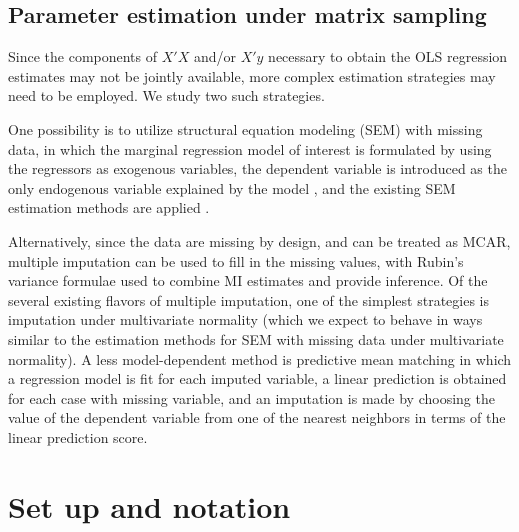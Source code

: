 \documentclass[11pt]{asaproc}
\begin{document}
\subsection{Parameter estimation under matrix sampling}

Since the components of $X'X$ and/or $X'y$ necessary to obtain the OLS regression
estimates may not be jointly available, more complex estimation strategies may need to
be employed. We study two such strategies.

One possibility is to utilize structural equation modeling (SEM) with missing data,
in which the marginal regression model of interest is formulated by using the regressors
as exogenous variables, the dependent variable is introduced as the only endogenous variable
explained by the model
\citep{bollen:selv:1989},
and the existing SEM estimation methods are applied
\citep{yuan:bentler:2000,savalei:2010}.

Alternatively, since the data are missing by design, and can be treated as MCAR, multiple imputation
\citep[MI]{rubin:1996,vanbuuren:2012}
can be used to fill in the missing values, with Rubin's variance formulae used to combine
MI estimates and provide inference. Of the several existing flavors of multiple imputation, 
one of the simplest strategies is
imputation under multivariate normality (which we expect to behave in ways similar to
the estimation methods for SEM with missing data under multivariate normality).
A less model-dependent method is predictive mean matching \citep{little:1988}
in which a regression model is fit for each imputed variable, a linear prediction
is obtained for each case with missing variable, and an imputation is made by choosing
the value of the dependent variable from one of the nearest neighbors in terms of
the linear prediction score.

\section{Set up and notation}
\end{document}
